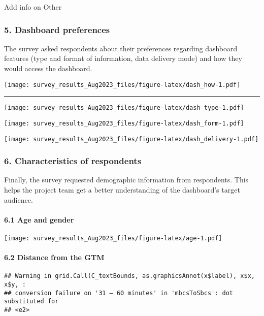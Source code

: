 \documentclass[
]{article}
\begin{document}
Add info on Other

\hypertarget{dashboard-preferences}{%
\subsubsection{5. Dashboard preferences}\label{dashboard-preferences}}

The survey asked respondents about their preferences regarding dashboard
features (type and format of information, data delivery mode) and how
they would access the dashboard.

\texttt{[image: survey\_results\_Aug2023\_files/figure-latex/dash\_how-1.pdf]}

\begin{center}\rule{0.5\linewidth}{0.5pt}\end{center}

\texttt{[image: survey\_results\_Aug2023\_files/figure-latex/dash\_type-1.pdf]}

\texttt{[image: survey\_results\_Aug2023\_files/figure-latex/dash\_form-1.pdf]}

\texttt{[image: survey\_results\_Aug2023\_files/figure-latex/dash\_delivery-1.pdf]}

\hypertarget{characteristics-of-respondents}{%
\subsubsection{6. Characteristics of
respondents}\label{characteristics-of-respondents}}

Finally, the survey requested demographic information from respondents.
This helps the project team get a better understanding of the
dashboard's target audience.

\hypertarget{age-and-gender}{%
\paragraph{6.1 Age and gender}\label{age-and-gender}}

\texttt{[image: survey\_results\_Aug2023\_files/figure-latex/age-1.pdf]}

\hypertarget{distance-from-the-gtm}{%
\paragraph{6.2 Distance from the GTM}\label{distance-from-the-gtm}}

\begin{verbatim}
## Warning in grid.Call(C_textBounds, as.graphicsAnnot(x$label), x$x, x$y, :
## conversion failure on '31 – 60 minutes' in 'mbcsToSbcs': dot substituted for
## <e2>
\end{verbatim}
\end{document}

